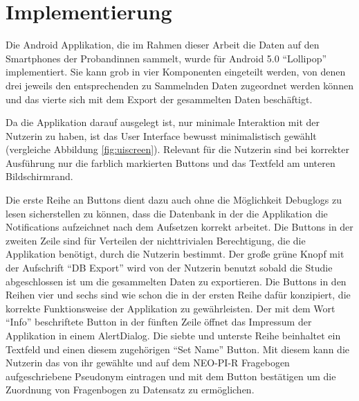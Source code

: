 
\chapter{Implementierung}
\label{ch:Implementierung}
Die Android Applikation, die im Rahmen dieser Arbeit die Daten auf den Smartphones der Probandinnen sammelt, wurde für Android 5.0 "`Lollipop"' implementiert.
Sie kann grob in vier Komponenten eingeteilt werden, von denen drei jeweils den entsprechenden zu Sammelnden Daten zugeordnet werden können und das vierte sich mit dem Export der gesammelten Daten beschäftigt.

Da die Applikation darauf ausgelegt ist, nur minimale Interaktion mit der Nutzerin zu haben,
ist das User Interface bewusst minimalistisch gewählt (vergleiche Abbildung \ref{fig:uiscreen}).
Relevant für die Nutzerin sind bei korrekter Ausführung nur die farblich markierten Buttons und das Textfeld am unteren Bildschirmrand.

Die erste Reihe an Buttons dient dazu auch ohne die Möglichkeit Debuglogs zu lesen sicherstellen zu können, dass die Datenbank in der die Applikation die Notifications aufzeichnet nach dem Aufsetzen korrekt arbeitet.
Die Buttons in der zweiten Zeile sind für Verteilen der nichttrivialen Berechtigung, die die Applikation benötigt, durch die Nutzerin bestimmt.
Der große grüne Knopf mit der Aufschrift "`DB Export"' wird von der Nutzerin benutzt sobald die Studie abgeschlossen ist um die gesammelten Daten zu exportieren.
Die Buttons in den Reihen vier und sechs sind wie schon die in der ersten Reihe dafür konzipiert, die korrekte Funktionsweise der Applikation zu gewährleisten.
Der mit dem Wort "`Info"' beschriftete Button in der fünften Zeile öffnet das Impressum der Applikation in einem AlertDialog.
Die siebte und unterste Reihe beinhaltet ein Textfeld und einen diesem zugehörigen "`Set Name"' Button.
Mit diesem kann die Nutzerin das von ihr gewählte und auf dem NEO-PI-R Fragebogen aufgeschriebene Pseudonym eintragen und mit dem Button bestätigen um die Zuordnung von Fragenbogen zu Datensatz zu ermöglichen.

